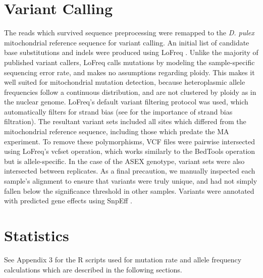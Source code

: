 \documentclass[12pt,twoside]{reedthesis}
\begin{document}
\section{Variant Calling}
The reads which survived sequence preprocessing were remapped to the \textit{D. pulex} mitochondrial reference sequence for variant calling.
An initial list of candidate base substitutions and \gls{indels} were produced using LoFreq \citep{wilm_lofreq:_2012}.
Unlike the majority of published variant callers, LoFreq calls mutations by modeling the sample-specific sequencing error rate, and makes no assumptions regarding ploidy.
This makes it well suited for mitochondrial mutation detection, because heteroplasmic allele frequencies follow a continuous distribution, and are not clustered by ploidy as in the nuclear genome.
LoFreq's default variant filtering protocol was used, which automatically filters for strand bias (see \citealp{guo_effect_2012} for the importance of strand bias filtration).
The resultant variant sets included all sites which differed from the mitochondrial reference sequence, including those which predate the \gls{MA} experiment.
To remove these polymorphisms, VCF files were pairwise intersected using LoFreq's vcfset operation, which works similarly to the BedTools operation \citep{quinlan_bedtools:_2010} but is allele-specific.
In the case of the \gls{ASEX} genotype, variant sets were also intersected between replicates.
As a final precaution, we manually inspected each sample's alignment to ensure that variants were truly unique, and had not simply fallen below the significance threshold in other samples.
Variants were annotated with predicted gene effects using SnpEff \citep{cingolani_program_2012}.


\section{Statistics}
See Appendix 3 for the R scripts used for mutation rate and allele frequency calculations which are described in the following sections.
\end{document}
